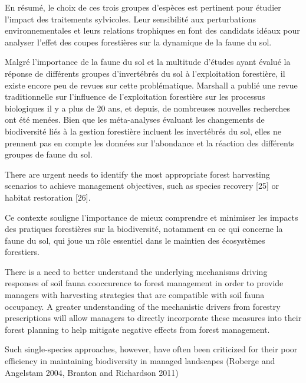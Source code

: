 En résumé, le choix de ces trois groupes d'espèces est pertinent pour étudier l'impact des traitements sylvicoles. 
Leur sensibilité aux perturbations environnementales et leurs relations trophiques en font des candidats idéaux pour analyser l'effet des coupes forestières sur la dynamique de la faune du sol.




Malgré l'importance de la faune du sol et la multitude d'études ayant évalué la réponse de différents groupes d'invertébrés du sol à l'exploitation forestière, il existe encore peu de revues sur cette problématique. 
Marshall a publié une revue traditionnelle sur l'influence de l'exploitation forestière sur les processus biologiques il y a plus de 20 ans, et depuis, de nombreuses nouvelles recherches ont été menées. 
Bien que les méta-analyses évaluant les changements de biodiversité liés à la gestion forestière incluent les invertébrés du sol, elles ne prennent pas en compte les données sur l'abondance et la réaction des différents groupes de faune du sol.


There are urgent needs to identify the most appropriate forest harvesting scenarios to achieve management objectives, such as species recovery [25] or habitat restoration [26].

Ce contexte souligne l'importance de mieux comprendre et minimiser les impacts des pratiques forestières sur la biodiversité, notamment en ce qui concerne la faune du sol, qui joue un rôle essentiel dans le maintien des écosystèmes forestiers.


There is a need to better understand the underlying mechanisms driving responses of soil fauna cooccurence to forest management in order to provide managers with harvesting strategies that are compatible with soil fauna occupancy.
A greater understanding of the mechanistic drivers from forestry prescriptions will allow managers to directly incorporate these measures into their forest planning to help mitigate negative effects from forest management.

Such single-species approaches, however, have often been criticized for their poor efficiency in maintaining biodiversity in managed landscapes (Roberge and Angelstam 2004, Branton and Richardson 2011)

